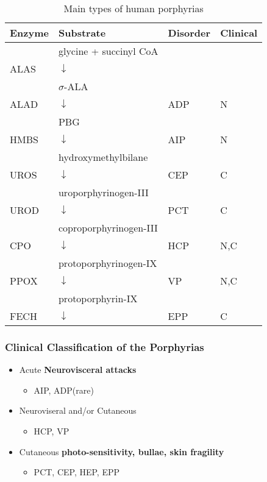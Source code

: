 \documentclass{scrartcl}
\begin{document}
\begin{table}[htbp]
\caption{\label{tab:orgf66db59}
Main types of human porphyrias}
\centering
\begin{tabular}{llll}
Enzyme & Substrate & Disorder & Clinical\\
\hline
 & glycine + succinyl CoA &  & \\
ALAS & \(\downarrow\) &  & \\
 & \(\sigma\)-ALA &  & \\
ALAD & \(\downarrow\) & ADP & N\\
 & PBG &  & \\
HMBS & \(\downarrow\) & AIP & N\\
 & hydroxymethylbilane &  & \\
UROS & \(\downarrow\) & CEP & C\\
 & uroporphyrinogen-III &  & \\
UROD & \(\downarrow\) & PCT & C\\
 & coproporphyrinogen-III &  & \\
CPO & \(\downarrow\) & HCP & N,C\\
 & protoporphyrinogen-IX &  & \\
PPOX & \(\downarrow\) & VP & N,C\\
 & protoporphyrin-IX &  & \\
FECH & \(\downarrow\) & EPP & C\\
\end{tabular}
\end{table}

\subsubsection{Clinical Classification of the Porphyrias}
\label{sec:orgd529ef9}
\begin{itemize}
\item Acute \textbf{Neurovisceral attacks}
\begin{itemize}
\item AIP, ADP(rare)
\end{itemize}

\item Neuroviseral and/or Cutaneous
\begin{itemize}
\item HCP, VP
\end{itemize}

\item Cutaneous \textbf{photo-sensitivity, bullae, skin fragility}
\begin{itemize}
\item PCT, CEP, HEP, EPP
\end{itemize}
\end{itemize}
\end{document}
